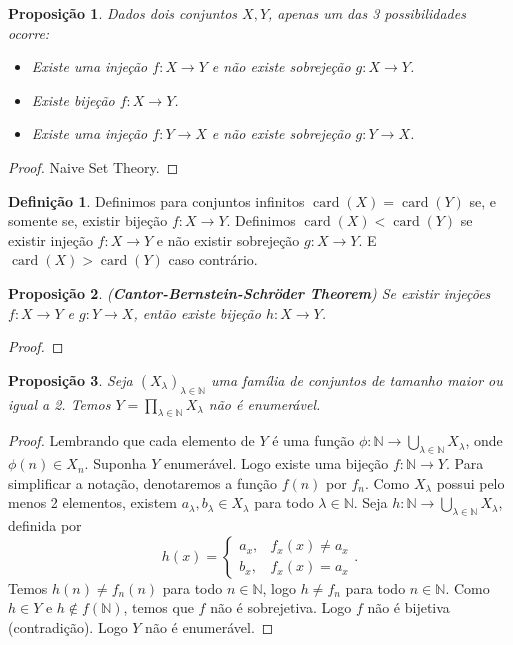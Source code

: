 \documentclass{article}
\theoremstyle{plain}
\newtheorem{prop}{Proposição}[section]
\theoremstyle{definition}
\newtheorem{definicao}{Definição}[section]
\theoremstyle{remark}
\DeclareMathOperator{\card}{card}
\begin{document}
\begin{prop}
	Dados dois conjuntos $X,Y$, apenas um das 3 possibilidades ocorre: 
	\begin{itemize}
		\item Existe uma injeção $f: X \to Y$ e não existe sobrejeção $g: X \to Y$.
		\item Existe bijeção $f: X\to Y$. 
		\item Existe uma injeção $f: Y \to X$ e não existe sobrejeção $g: Y \to X$.
	\end{itemize}
\end{prop}
\begin{proof}
	Naive Set Theory. %
\end{proof}
\begin{definicao}
	Definimos para conjuntos infinitos $\card(X) = \card(Y)$ se, e somente se, existir bijeção $f: X\to Y$. Definimos $\card(X) < \card(Y)$ se existir injeção $f: X \to Y$ e não existir sobrejeção $g:X \to Y$. E $\card(X) > \card(Y)$ caso contrário.
\end{definicao}
\begin{prop}
	(\textbf{Cantor-Bernstein-Schröder Theorem}) Se existir injeções $f:X\to Y$ e $g: Y \to X$, então existe bijeção $h:X\to Y$.
\end{prop}
\begin{proof}
\end{proof}
\begin{prop}
	Seja $(X_{\lambda})_{\lambda \in \mathbb{N}}$ uma família de conjuntos de tamanho maior ou igual a 2. Temos $Y = \displaystyle\prod_{\lambda \in \mathbb{N}} X_{\lambda}$ não é enumerável.
\end{prop}
\begin{proof}
	Lembrando que cada elemento de $Y$ é uma função $\phi: \mathbb{N} \to\displaystyle\bigcup_{\lambda \in \mathbb{N}} X_{\lambda}$, onde $\phi(n) \in X_n$. Suponha $Y$ enumerável. Logo existe uma bijeção $f: \mathbb{N} \to Y$. Para simplificar a notação, denotaremos a função $f(n)$ por $f_n$.  Como $X_{\lambda}$ possui pelo menos 2 elementos, existem $a_\lambda, b_\lambda \in X_{\lambda}$ para todo $\lambda\in \mathbb{N}$. Seja $h: \mathbb{N} \to \displaystyle\bigcup_{\lambda \in \mathbb{N}} X_{\lambda}$, definida por $$h(x) = \begin{cases} a_x , & f_x(x) \neq a_x\\ b_x, & f_x(x) = a_x \end{cases}.$$
		Temos $h(n) \neq f_n(n)$ para todo $n\in \mathbb{N}$, logo $h \neq f_n$ para todo $n\in \mathbb{N}$. Como $h\in Y$ e $h \not \in f(\mathbb{N})$, temos que $f$ não é sobrejetiva. Logo $f$ não é bijetiva (contradição). Logo $Y$ não é enumerável.
\end{proof}
\end{document}
